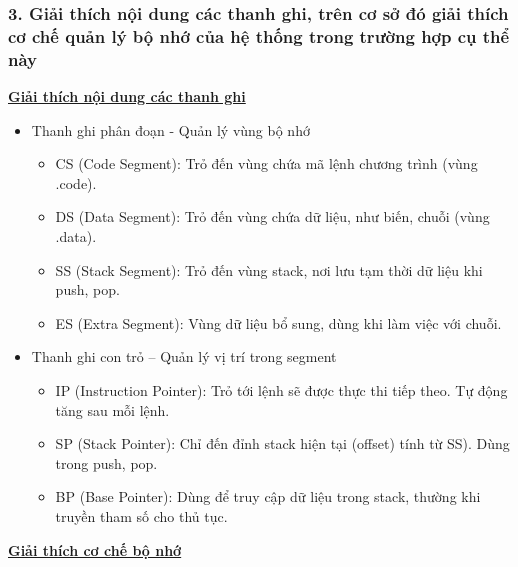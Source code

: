 \subsubsection*{3. Giải thích nội dung các thanh ghi, trên cơ sở đó giải thích cơ chế quản lý bộ nhớ của hệ thống trong trường hợp cụ thể này}
\textbf{\underline{Giải thích nội dung các thanh ghi}}
\begin{itemize}
    \item Thanh ghi phân đoạn - Quản lý vùng bộ nhớ
    \begin{itemize}
        \item CS (Code Segment): Trỏ đến vùng chứa mã lệnh chương trình (vùng .code).
        \item DS (Data Segment): Trỏ đến vùng chứa dữ liệu, như biến, chuỗi (vùng .data).
        \item SS (Stack Segment): Trỏ đến vùng stack, nơi lưu tạm thời dữ liệu khi push, pop.
        \item ES (Extra Segment): Vùng dữ liệu bổ sung, dùng khi làm việc với chuỗi.
    \end{itemize}
    \item Thanh ghi con trỏ – Quản lý vị trí trong segment
    \begin{itemize}
        \item IP (Instruction Pointer): Trỏ tới lệnh sẽ được thực thi tiếp theo. Tự động tăng sau mỗi lệnh.
        \item SP (Stack Pointer): Chỉ đến đỉnh stack hiện tại (offset) tính từ SS). Dùng trong push, pop.
        \item BP (Base Pointer): Dùng để truy cập dữ liệu trong stack, thường khi truyền tham số cho thủ tục.
    \end{itemize}
\end{itemize}

\textbf{\underline{Giải thích cơ chế bộ nhớ}}

